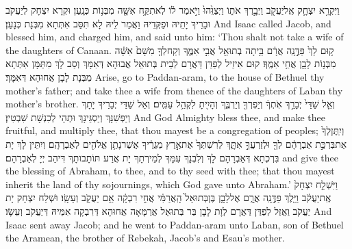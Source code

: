 \newperek
{}%
{וַיִּקְרָ֥א יִצְחָ֛ק אֶֽל\maqqaf יַעֲקֹ֖ב וַיְבָ֣רֶךְ אֹת֑וֹ וַיְצַוֵּ֙הוּ֙ וַיֹּ֣אמֶר ל֔וֹ לֹֽא\maqqaf תִקַּ֥ח אִשָּׁ֖ה מִבְּנ֥וֹת כְּנָֽעַן׃}
{וּקְרָא יִצְחָק לְיַעֲקֹב וּבָרֵיךְ יָתֵיהּ וּפַקְּדֵיהּ וַאֲמַר לֵיהּ לָא תִּסַּב אִתְּתָא מִבְּנָת כְּנָעַן׃}
{And Isaac called Jacob, and blessed him, and charged him, and said unto him: ‘Thou shalt not take a wife of the daughters of Canaan.}{}
{ק֥וּם לֵךְ֙ פַּדֶּ֣נָֽה אֲרָ֔ם בֵּ֥יתָה בְתוּאֵ֖ל אֲבִ֣י אִמֶּ֑ךָ וְקַח\maqqaf לְךָ֤ מִשָּׁם֙ אִשָּׁ֔ה מִבְּנ֥וֹת לָבָ֖ן אֲחִ֥י אִמֶּֽךָ׃}
{קוּם אִיזֵיל לְפַדַּן דַּאֲרָם לְבֵית בְּתוּאֵל אֲבוּהָא דְּאִמָּךְ וְסַב לָךְ מִתַּמָּן אִתְּתָא מִבְּנָת לָבָן אֲחוּהָא דְּאִמָּךְ׃}
{Arise, go to Paddan-aram, to the house of Bethuel thy mother’s father; and take thee a wife from thence of the daughters of Laban thy mother’s brother.}{}
{וְאֵ֤ל שַׁדַּי֙ יְבָרֵ֣ךְ אֹֽתְךָ֔ וְיַפְרְךָ֖ וְיַרְבֶּ֑ךָ וְהָיִ֖יתָ לִקְהַ֥ל עַמִּֽים׃}
{וְאֵל שַׁדַּי יְבָרֵיךְ יָתָךְ וְיַפְּשִׁנָּךְ וְיַסְגֵּינָךְ וּתְהֵי לְכִנְשָׁת שִׁבְטִין׃}
{And God Almighty bless thee, and make thee fruitful, and multiply thee, that thou mayest be a congregation of peoples;}{}
{וְיִֽתֶּן\maqqaf לְךָ֙ אֶת\maqqaf בִּרְכַּ֣ת אַבְרָהָ֔ם לְךָ֖ וּלְזַרְעֲךָ֣ אִתָּ֑ךְ לְרִשְׁתְּךָ֙ אֶת\maqqaf אֶ֣רֶץ מְגֻרֶ֔יךָ אֲשֶׁר\maqqaf נָתַ֥ן אֱלֹהִ֖ים לְאַבְרָהָֽם׃}
{וְיִתֵּין לָךְ יָת בִּרְכְתָא דְּאַבְרָהָם לָךְ וְלִבְנָךְ עִמָּךְ לְמֵירְתָךְ יָת אֲרַע תּוֹתָבוּתָךְ דִּיהַב יְיָ לְאַבְרָהָם׃}
{and give thee the blessing of Abraham, to thee, and to thy seed with thee; that thou mayest inherit the land of thy sojournings, which God gave unto Abraham.’}{}
{וַיִּשְׁלַ֤ח יִצְחָק֙ אֶֽת\maqqaf יַעֲקֹ֔ב וַיֵּ֖לֶךְ פַּדֶּ֣נָֽה אֲרָ֑ם אֶל\maqqaf לָבָ֤ן בֶּן\maqqaf בְּתוּאֵל֙ הָֽאֲרַמִּ֔י אֲחִ֣י רִבְקָ֔ה אֵ֥ם יַעֲקֹ֖ב וְעֵשָֽׂו׃}
{וּשְׁלַח יִצְחָק יָת יַעֲקֹב וַאֲזַל לְפַדַּן דַּאֲרָם לְוָת לָבָן בַּר בְּתוּאֵל אֲרַמָּאָה אֲחוּהָא דְּרִבְקָה אִמֵּיהּ דְּיַעֲקֹב וְעֵשָׂו׃}
{And Isaac sent away Jacob; and he went to Paddan-aram unto Laban, son of Bethuel the Aramean, the brother of Rebekah, Jacob’s and Esau’s mother.}{}
